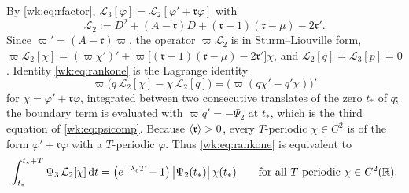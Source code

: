 \begin{remark}\label{wk:rem:secondorder}
By \eqref{wk:eq:rfactor}, $\mathcal L_3[\varphi]=\mathcal L_2[\varphi'+\mathfrak r\varphi]$ with
\[
\mathcal L_2:=D^2+(A-\mathfrak r)D+(\mathfrak r-1)(\mathfrak r-\mu)-2\mathfrak r' .
\]
Since $\varpi'=(A-\mathfrak r)\varpi$, the operator $\varpi\mathcal L_2$ is in Sturm--Liouville form, $\varpi\mathcal L_2[\chi]=(\varpi\chi')'+\varpi\bigl[(\mathfrak r-1)(\mathfrak r-\mu)-2\mathfrak r'\bigr]\chi$, and $\mathcal L_2[q]=\mathcal L_3[p]=0$. Identity \eqref{wk:eq:rankone} is the Lagrange identity
\[
\varpi\bigl(q\,\mathcal L_2[\chi]-\chi\,\mathcal L_2[q]\bigr)=\bigl(\varpi(q\chi'-q'\chi)\bigr)'
\]
for $\chi=\varphi'+\mathfrak r\varphi$, integrated between two consecutive translates of the zero $t_\ast$ of $q$; the boundary term is evaluated with $\varpi q'=-\Psi_2$ at $t_\ast$, which is the third equation of \eqref{wk:eq:psicomp}. Because $\left\langle \mathfrak r\right\rangle>0$, every $T$-periodic $\chi\in C^2$ is of the form $\varphi'+\mathfrak r\varphi$ with a $T$-periodic $\varphi$. Thus \eqref{wk:eq:rankone} is equivalent to
\begin{equation}\label{wk:eq:ranktwo}
\int_{t_\ast}^{t_\ast+T}\Psi_3\,\mathcal L_2[\chi]\,\mathrm dt=\bigl(e^{-\lambda_cT}-1\bigr)\,\bigl|\Psi_2(t_\ast)\bigr|\,\chi(t_\ast)
\qquad\text{for all $T$-periodic }\chi\in C^2(\mathbb R).
\end{equation}
\end{remark}

